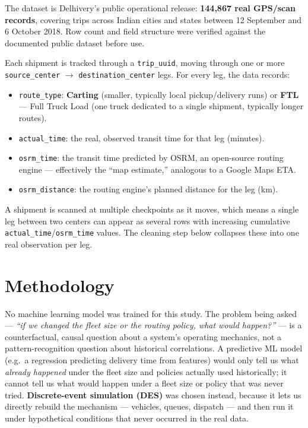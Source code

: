 \documentclass[10.5pt,a4paper]{article}
\begin{document}
The dataset is Delhivery's public operational release: \textbf{144,867 real GPS/scan records}, covering trips across Indian cities and states between 12 September and 6 October 2018. Row count and field structure were verified against the documented public dataset before use.

Each shipment is tracked through a \texttt{trip\_uuid}, moving through one or more \texttt{source\_center} $\rightarrow$ \texttt{destination\_center} legs. For every leg, the data records:

\begin{itemize}[leftmargin=1.4em]
  \item \texttt{route\_type}: \textbf{Carting} (smaller, typically local pickup/delivery runs) or \textbf{FTL} --- Full Truck Load (one truck dedicated to a single shipment, typically longer routes).
  \item \texttt{actual\_time}: the real, observed transit time for that leg (minutes).
  \item \texttt{osrm\_time}: the transit time predicted by OSRM, an open-source routing engine --- effectively the ``map estimate,'' analogous to a Google Maps ETA.
  \item \texttt{osrm\_distance}: the routing engine's planned distance for the leg (km).
\end{itemize}

A shipment is scanned at multiple checkpoints as it moves, which means a single leg between two centers can appear as several rows with increasing cumulative \texttt{actual\_time}/\texttt{osrm\_time} values. The cleaning step below collapses these into one real observation per leg.

\section{Methodology}

No machine learning model was trained for this study. The problem being asked --- \emph{``if we changed the fleet size or the routing policy, what would happen?''} --- is a counterfactual, causal question about a system's operating mechanics, not a pattern-recognition question about historical correlations. A predictive ML model (e.g.\ a regression predicting delivery time from features) would only tell us what \emph{already happened} under the fleet size and policies actually used historically; it cannot tell us what would happen under a fleet size or policy that was never tried. \textbf{Discrete-event simulation (DES)} was chosen instead, because it lets us directly rebuild the mechanism --- vehicles, queues, dispatch --- and then run it under hypothetical conditions that never occurred in the real data.
\end{document}
